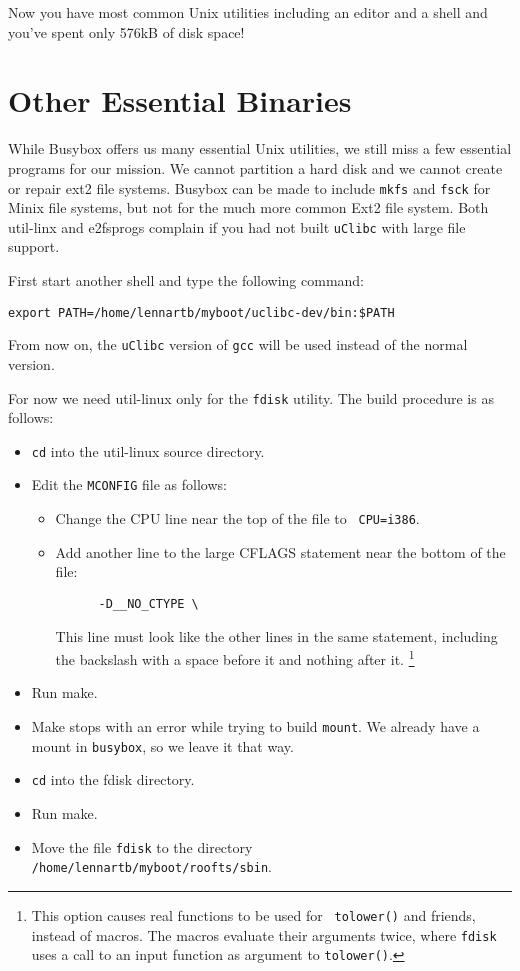 \documentclass[12pt,a4paper]{article}
\begin{document}
Now you have most common Unix utilities including an editor and a
shell and you've spent only 576kB of disk space!

\section{Other Essential Binaries}

While Busybox offers us many essential Unix utilities, we still miss a
few essential programs for our mission. We cannot partition a hard
disk and we cannot create or repair ext2 file systems. Busybox can be
made to include {\tt mkfs} and {\tt fsck} for Minix file systems, but
not for the much more common Ext2 file system. Both util-linx and
e2fsprogs complain if you had not built {\tt uClibc} with large file
support.

First start another shell and type the following command:
\begin{verbatim}
export PATH=/home/lennartb/myboot/uclibc-dev/bin:$PATH
\end{verbatim}
From now on, the {\tt uClibc} version of {\tt gcc} will be used
instead of the normal version.

For now we need util-linux only for the {\tt fdisk} utility. The build
procedure is as follows:
\begin{itemize}
\item {\tt cd} into the util-linux source directory.
\item Edit the {\tt MCONFIG} file as follows:
   \begin{itemize}
   \item Change the CPU line near the top of the file to {\tt
   CPU=i386}.
   \item Add another line to the large CFLAGS statement near the
   bottom of the file:
   \begin{verbatim}
      -D__NO_CTYPE \
   \end{verbatim}
   This line must look like the other lines in the same statement,
   including the backslash with a space before it and nothing after
   it. \footnote{This option causes real functions to be used for {\tt
   tolower()} and friends, instead of macros. The macros
   evaluate their arguments twice, where {\tt fdisk} uses a call to an
   input function as argument to {\tt tolower()}.}
   \end{itemize}
\item Run make.
\item Make stops with an error while trying to build {\tt mount}. We
  already have a mount in {\tt busybox}, so we leave it that way.
\item {\tt cd} into the fdisk directory.
\item Run make.
\item Move the file {\tt fdisk} to the directory\\
  {\tt /home/lennartb/myboot/roofts/sbin}.
\end{itemize}
\end{document}
